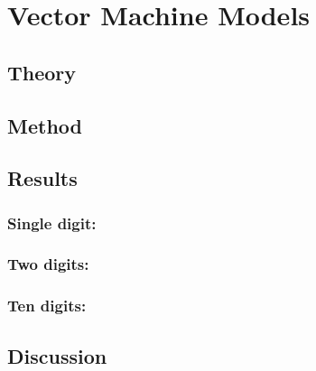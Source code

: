 \chapter{Vector Machine Models}
\section{Theory}

\section{Method}

\section{Results}

\subsection{Single digit:}

\subsection{Two digits:}

\subsection{Ten digits:}

\section{Discussion}